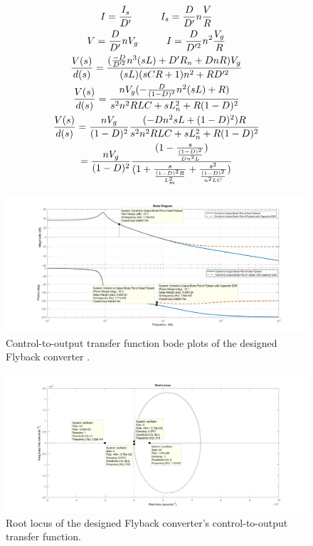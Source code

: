 \documentclass{article}
\newcommand\tab[1][1cm]{\hspace*{#1}}
\begin{document}
\begin{enumerate}
\begin{gather*}
        I=\frac{I_s}{D'} \tab I_s=\frac{D}{D'}n\frac{V}{R}\\
        V=\frac{D}{D'}nV_g \tab I=\frac{D}{D'^2}n^2\frac{V_g}{R}\\
        \frac{V(s)}{d(s)}=\frac{(\frac{-D}{D'^2}n^3(sL)+D'R_n+DnR)V_g}{(sL)(sCR+1)n^2+RD'^2}\\
        \frac{V(s)}{d(s)}=\frac{nV_g(-\frac{D}{(1-D)^2}n^2(sL)+R)}{s^2n^2RLC+sL_n^2+R(1-D)^2}\\
        \frac{V(s)}{d(s)}=\frac{nV_g}{(1-D)^2}\frac{(-Dn^2sL+(1-D)^2)R}{s^2n^2RLC+sL_n^2+R(1-D)^2}\\
        =\frac{nV_g}{(1-D)^2}\frac{(1-\frac{s}{\frac{(1-D)^2}{Dn^2L}})}{(1+\frac{s}{\frac{(1-D)^2R}{L_m^2}}+\frac{s^2}{\frac{(1-D)^2}{n^2LC}})}\\
    \end{gather*}
\end{enumerate}
\begin{figure}[H]
    \centering
    \includegraphics[scale=0.2]{open loop direkt Flybackin(oscillator yok).jpg}
    \caption{Control-to-output transfer function bode plots of the designed Flyback converter .}
    \label{fig:my_label}
\end{figure}
    \begin{figure}[H]
    \centering
    \includegraphics[scale=0.2]{pole zero locations detection with rlocus.jpg}
    \caption{Root locus of the designed Flyback converter's control-to-output transfer function.}
    \label{fig:my_label}
\end{figure}
\end{document}
